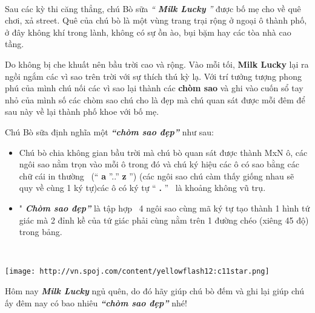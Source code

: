  

Sau các kỳ thi căng thẳng, chú Bò sữa \emph{ “ \textbf{ Milk Lucky } ” } được bố mẹ cho về quê chơi, xả street. Quê của chú bò là một vùng trang trại rộng ở ngoại ô thành phố, ở đây không khí trong lành, không có sự ồn ào, bụi bặm hay các tòa nhà cao tầng.

Do không bị che khuất nên bầu trời cao và rộng. Vào mỗi tối, \textbf{ Milk Lucky } lại ra ngồi ngắm các vì sao trên trời với sự thích thú kỳ lạ. Với trí tưởng tượng phong phú của mình chú nối các vì sao lại thành các \textbf{ chòm sao } và ghi vào cuốn sổ tay nhỏ của mình số các chòm sao chú cho là đẹp mà chú quan sát được mỗi đêm để sau này về lại thành phố khoe với bố mẹ.

Chú Bò sữa định nghĩa một \textbf{\emph{ “chòm sao đẹp” }} như sau:
\begin{itemize}
	\item Chú bò chia không gian bầu trời mà chú bò quan sát được thành MxN ô, các ngôi sao nằm trọn vào mỗi ô trong đó và chú ký hiệu các ô có sao bằng các chữ cái in thường  (“ \textbf{ a } ”..” \textbf{ z } ”) (các ngôi sao chú càm thấy giống nhau sẽ quy về cùng 1 ký tự)các ô có ký tự “ \textbf{ . } ”  là khoảng không vũ trụ.
	\item " \textbf{\emph{ Chòm sao đẹp” }} là tập hợp  4 ngôi sao cùng mã ký tự tạo thành 1 hình tứ giác mà 2 đỉnh kề của tứ giác phải cùng nằm trên 1 đường chéo (xiêng 45 độ) trong bảng.
\end{itemize}

 


\texttt{[image: http://vn.spoj.com/content/yellowflash12:c11star.png]}

Hôm nay \textbf{\emph{ Milk Lucky }} ngủ quên, do đó hãy giúp chú bò đếm và ghi lại giúp chú ấy đêm nay có bao nhiêu \textbf{\emph{ “chòm sao đẹp” }} nhé!
\begin{itemize}
\end{itemize}